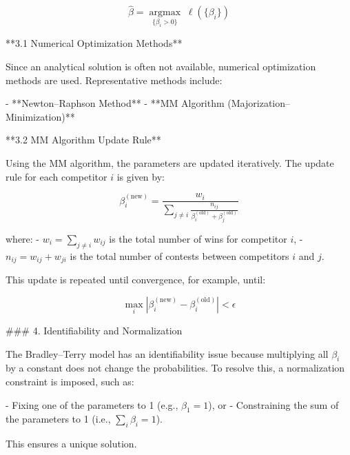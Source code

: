 \[
\hat{\beta} = \underset{\{\beta_i > 0\}}{\operatorname{argmax}} \; \ell(\{\beta_i\})
\]

**3.1 Numerical Optimization Methods**

Since an analytical solution is often not available, numerical optimization methods are used. Representative methods include:

- **Newton–Raphson Method**
- **MM Algorithm (Majorization–Minimization)**

**3.2 MM Algorithm Update Rule**

Using the MM algorithm, the parameters are updated iteratively. The update rule for each competitor \(i\) is given by:

\[
\beta_i^{(\text{new})} = \frac{w_i}{\sum_{j \neq i} \frac{n_{ij}}{\beta_i^{(\text{old})} + \beta_j^{(\text{old})}}}
\]

where:
- \(w_i = \sum_{j \neq i} w_{ij}\) is the total number of wins for competitor \(i\),
- \(n_{ij} = w_{ij} + w_{ji}\) is the total number of contests between competitors \(i\) and \(j\).

This update is repeated until convergence, for example, until:

\[
\max_i \left|\beta_i^{(\text{new})} - \beta_i^{(\text{old})}\right| < \epsilon
\]

### 4. Identifiability and Normalization

The Bradley–Terry model has an identifiability issue because multiplying all \(\beta_i\) by a constant does not change the probabilities. To resolve this, a normalization constraint is imposed, such as:

- Fixing one of the parameters to 1 (e.g., \(\beta_1 = 1\)), or
- Constraining the sum of the parameters to 1 (i.e., \(\sum_i \beta_i = 1\)).

This ensures a unique solution.
